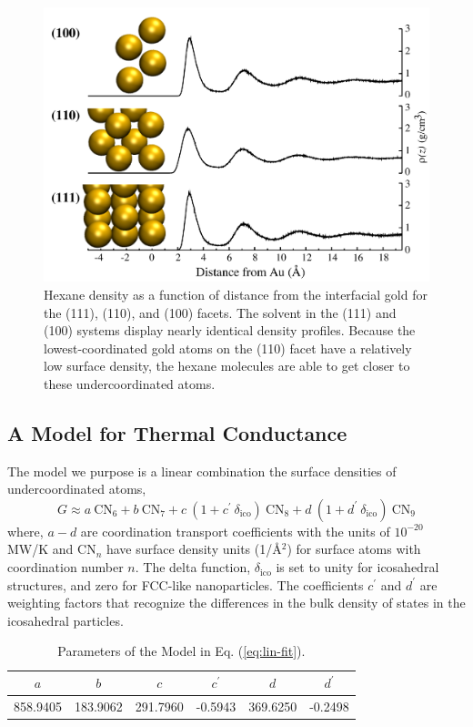 \documentclass[journal = jpccck, manuscript = suppinfo]{achemso}
\begin{document}
\begin{figure}
        \includegraphics[width=\linewidth]{figures/stacked-hex-facets.pdf}
        \caption{Hexane density as a function of distance from the
          interfacial gold for the (111), (110), and (100) facets. The
          solvent in the (111) and (100) systems display nearly
          identical density profiles. Because the lowest-coordinated
          gold atoms on the (110) facet have a relatively low surface
          density, the hexane molecules are able to get closer to
          these undercoordinated atoms.}
        \label{fig:dens}
\end{figure}

\subsection{A Model for Thermal Conductance}
The model we purpose is a linear combination the surface densities of
undercoordinated atoms, 
\begin{equation}
G \approx a~\mathrm{CN}_{6} + b~\mathrm{CN}_{7} + c~\left(1+c^{\prime}~\delta_\mathrm{ico}\right)~\mathrm{CN}_{8} + d~\left( 1 + d^{\prime}~\delta_\mathrm{ico} \right)~\mathrm{CN}_{9}
\label{eq:lin-fit}
\end{equation}
where, $a - d$ are coordination transport coefficients with the units
of $10^{-20}$ MW/K and $\mathrm{CN}_{n}$ have surface density units
(1/\AA $^2$) for surface atoms with coordination number $n$.  The
delta function, $\delta_\mathrm{ico}$ is set to unity for icosahedral
structures, and zero for FCC-like nanoparticles.  The coefficients
$c^{\prime}$ and $d^{\prime}$ are weighting factors that recognize the
differences in the bulk density of states in the icosahedral
particles. \begin{table}
\centering
\caption{Parameters of the Model in Eq. (\ref{eq:lin-fit}).
  \label{tab:coeff to fit}}
\begin{tabular}{ cccccc }
\toprule
 $a$ & $b$ & $c$ & $c^{\prime}$ & $d$ & $d^{\prime}$ \\
\midrule
 858.9405 & 183.9062 & 291.7960 & -0.5943 & 369.6250 & -0.2498 \\
\bottomrule
\end{tabular}
\end{table}
\end{document}
